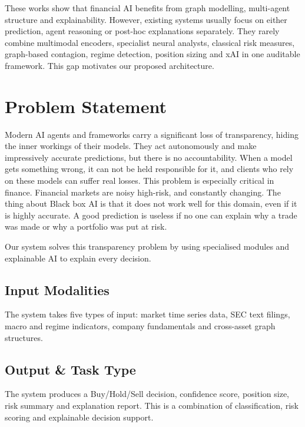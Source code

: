 \documentclass[conference]{IEEEtran}
\begin{document}
These works show that financial AI benefits from graph modelling, multi-agent structure and explainability. However, existing systems usually focus on either prediction, agent reasoning or post-hoc explanations separately. They rarely combine multimodal encoders, specialist neural analysts, classical risk measures, graph-based contagion, regime detection, position sizing and xAI in one auditable framework. This gap motivates our proposed architecture.

\section{Problem Statement} 

Modern AI agents and frameworks carry a significant loss of transparency, hiding the inner workings of their models. They act autonomously and make impressively accurate predictions, but there is no accountability. When a model gets something wrong, it can not be held responsible for it, and clients who rely on these models can suffer real losses. This problem is especially critical in finance. Financial markets are noisy high-risk, and constantly changing. The thing about Black box AI is that it does not work well for this domain, even if it is highly accurate. A good prediction is useless if no one can explain why a trade was made or why a portfolio was put at risk.  

Our system solves this transparency problem by using specialised modules and explainable AI to explain every decision.

\subsection{Input Modalities}
The system takes five types of input: market time series data, SEC text filings, macro and regime indicators, company fundamentals and cross-asset graph structures.

\subsection{Output \& Task Type}
The system produces a Buy/Hold/Sell decision, confidence score, position size, risk summary and explanation report. This is a combination of classification, risk scoring and explainable decision support.
\end{document}
